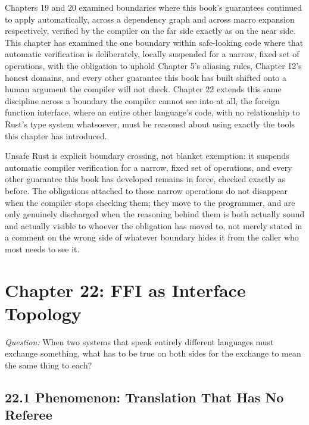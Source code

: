 \documentclass[11pt]{book}
\begin{document}
Chapters 19 and 20 examined boundaries where this book's guarantees continued to apply automatically, across a dependency graph and across macro expansion respectively, verified by the compiler on the far side exactly as on the near side. This chapter has examined the one boundary within safe-looking code where that automatic verification is deliberately, locally suspended for a narrow, fixed set of operations, with the obligation to uphold Chapter 5's aliasing rules, Chapter 12's honest domains, and every other guarantee this book has built shifted onto a human argument the compiler will not check. Chapter 22 extends this same discipline across a boundary the compiler cannot see into at all, the foreign function interface, where an entire other language's code, with no relationship to Rust's type system whatsoever, must be reasoned about using exactly the tools this chapter has introduced.

\begin{invariantbox}
Unsafe Rust is explicit boundary crossing, not blanket exemption: it suspends automatic compiler verification for a narrow, fixed set of operations, and every other guarantee this book has developed remains in force, checked exactly as before. The obligations attached to those narrow operations do not disappear when the compiler stops checking them; they move to the programmer, and are only genuinely discharged when the reasoning behind them is both actually sound and actually visible to whoever the obligation has moved to, not merely stated in a comment on the wrong side of whatever boundary hides it from the caller who most needs to see it.
\end{invariantbox}

\clearpage

\chapter*{Chapter 22: FFI as Interface Topology}

\begin{firstprinciples}
\textit{Question:} When two systems that speak entirely different languages must exchange something, what has to be true on both sides for the exchange to mean the same thing to each?
\end{firstprinciples}

\section*{22.1 Phenomenon: Translation That Has No Referee}
\end{document}

